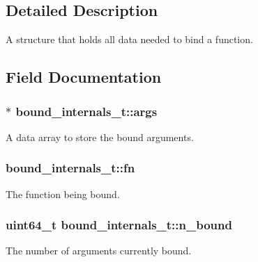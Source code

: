 \subsection{Detailed Description}
A structure that holds all data needed to bind a function. 

\subsection{Field Documentation}
\subsubsection[{\texorpdfstring{args}{args}}]{$\ast$ bound\+\_\+internals\+\_\+t\+::args}\hypertarget{structbound__internals__t_a84757175e6e08d7364e8aad728e49985}{}\label{structbound__internals__t_a84757175e6e08d7364e8aad728e49985}


A data array to store the bound arguments. 

\subsubsection[{\texorpdfstring{fn}{fn}}]{ bound\+\_\+internals\+\_\+t\+::fn}\hypertarget{structbound__internals__t_ac9b29b4f9b69674cef9fb3d083b92521}{}\label{structbound__internals__t_ac9b29b4f9b69674cef9fb3d083b92521}


The function being bound. 

\subsubsection[{\texorpdfstring{n\+\_\+bound}{n_bound}}]{\setlength{\rightskip}{0pt plus 5cm}uint64\+\_\+t bound\+\_\+internals\+\_\+t\+::n\+\_\+bound}\hypertarget{structbound__internals__t_aa959691320a507b149ff25164740a323}{}\label{structbound__internals__t_aa959691320a507b149ff25164740a323}


The number of arguments currently bound. 

